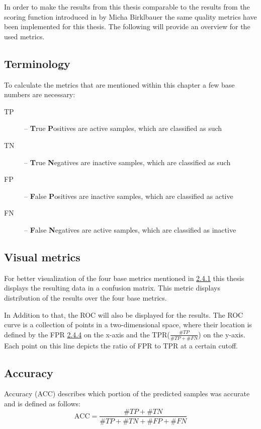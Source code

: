 In order to make the results from this thesis comparable to the results from the 
scoring function introduced in \cite[]{Birklbauer2021} by Micha Birklbauer the same quality metrics have been 
implemented for this thesis. The following will provide an overview for the used metrics.
\subsection{Terminology} \label{terminology}
To calculate the metrics that are mentioned within this chapter a few base numbers are necessary:
\begin{description}
    \item [TP] -- \textbf{T}rue \textbf{P}ositives are active samples, which are classified as such
    \item [TN] -- \textbf{T}rue \textbf{N}egatives are inactive samples, which are classified as such
    \item [FP] -- \textbf{F}alse \textbf{P}ositives are inactive samples, which are classified as active
    \item [FN] -- \textbf{F}alse \textbf{N}egatives are active samples, which are classified as inactive 
\end{description}

\subsection{Visual metrics}
For better visualization of the four base metrics mentioned in \href{terminology}{2.4.1}
this thesis displays the resulting data in a confusion matrix. This metric displays distribution of the results over the four base metrics.

In Addition to that, the ROC will also be displayed for the results.
The ROC curve is a collection of points in a two-dimensional 
space, where their location is defined by the FPR \href{fpr}{2.4.4} on the x-axis and the TPR($\frac{\#TP}{\#TP+\#FN}$) on the y-axis. 
Each point on this line depicts the ratio of FPR to TPR at a certain cutoff. \cite[]{Lopes2017}


\subsection{Accuracy}
Accuracy (ACC) describes which portion of the predicted samples was accurate and is defined as follows:
\begin{equation*}
    \text{ACC} = \frac{\#TP+\#TN}{\#TP+\#TN+\#FP+\#FN}
\end{equation*}
\cite[]{Hossin2015}
